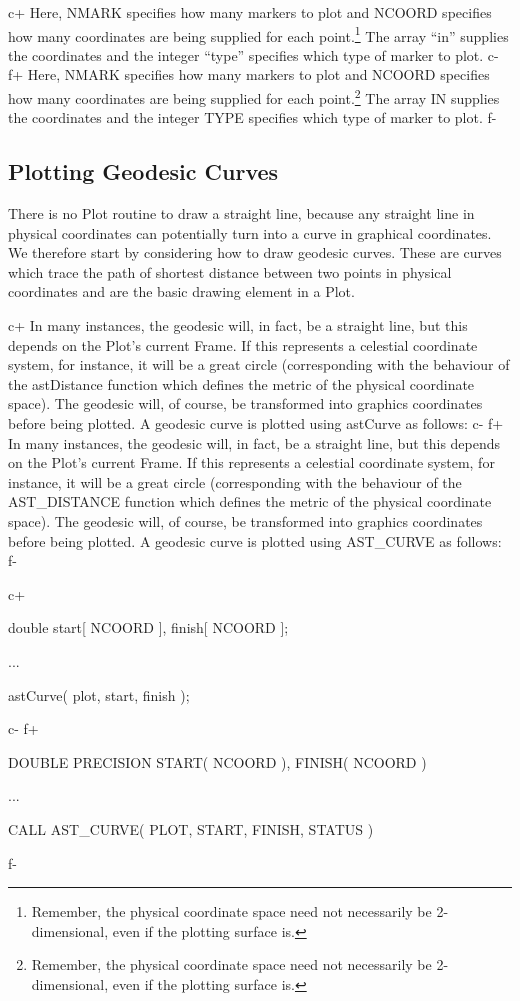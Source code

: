 \documentclass[twoside,11pt]{starlink}
\begin{document}
c+
Here, NMARK specifies how many markers to plot and NCOORD specifies
how many coordinates are being supplied for each
point.\footnote{Remember, the physical coordinate space need not
necessarily be 2-dimensional, even if the plotting surface is.} The
array ``in'' supplies the coordinates and the integer ``type''
specifies which type of marker to plot.
c-
f+
Here, NMARK specifies how many markers to plot and NCOORD specifies
how many coordinates are being supplied for each
point.\footnote{Remember, the physical coordinate space need not
necessarily be 2-dimensional, even if the plotting surface is.} The
array IN supplies the coordinates and the integer TYPE specifies which
type of marker to plot.
f-

\subsection{\label{ss:plottinggeodesics}Plotting Geodesic Curves}

There is no Plot routine to draw a straight line, because any straight
line in physical coordinates can potentially turn into a curve in
graphical coordinates. We therefore start by considering how to draw
geodesic curves.  These are curves which trace the path of shortest
distance between two points in physical coordinates
 and are the basic drawing element in a Plot.

c+
In many instances, the geodesic will, in fact, be a straight line, but
this depends on the Plot's current Frame. If this represents a
celestial coordinate system, for instance, it will be a great circle
(corresponding with the behaviour of the astDistance function which
defines the metric of the physical coordinate space).  The geodesic
will, of course, be transformed into graphics coordinates before being
plotted. A geodesic curve is plotted using astCurve as follows:
c-
f+
In many instances, the geodesic will, in fact, be a straight line, but
this depends on the Plot's current Frame. If this represents a
celestial coordinate system, for instance, it will be a great circle
(corresponding with the behaviour of the AST\_DISTANCE function which
defines the metric of the physical coordinate space).  The geodesic
will, of course, be transformed into graphics coordinates before being
plotted. A geodesic curve is plotted using AST\_CURVE as follows:
f-

c+
\small
\begin{terminalv}
double start[ NCOORD ], finish[ NCOORD ];

...

astCurve( plot, start, finish );
\end{terminalv}
\normalsize
c-
f+
\small
\begin{terminalv}
      DOUBLE PRECISION START( NCOORD ), FINISH( NCOORD )

      ...

      CALL AST_CURVE( PLOT, START, FINISH, STATUS )
\end{terminalv}
\normalsize
f-
\end{document}
